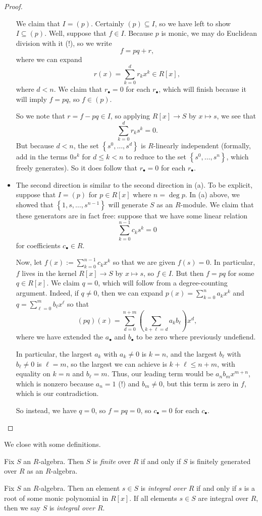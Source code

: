 \begin{proof}
\begin{itemize}
		We claim that $I=(p)$. Certainly $(p)\subseteq I$, so we have left to show $I\subseteq(p)$. Well, suppose that $f\in I$. Because $p$ is monic, we may do Euclidean division with it (!), so we write
		\[f=pq+r,\]
		where we can expand
		\[r(x)=\sum_{k=0}^dr_kx^k\in R[x],\]
		where $d<n$. We claim that $r_\bullet=0$ for each $r_\bullet$, which will finish because it will imply $f=pq$, so $f\in(p)$.

		So we note that $r=f-pq\in I$, so applying $R[x]\to S$ by $x\mapsto s$, we see that
		\[\sum_{k=0}^dr_ks^k=0.\]
		But because $d<n$, the set $\left\{s^0,\ldots,s^d\right\}$ is $R$-linearly independent (formally, add in the terms $0s^k$ for $d\le k<n$ to reduce to the set $\left\{s^0,\ldots,s^n\right\}$, which freely generates). So it does follow that $r_\bullet=0$ for each $r_\bullet$.

		\item The second direction is similar to the second direction in (a). To be explicit, suppose that $I=(p)$ for $p\in R[x]$ where $n=\deg p$. In (a) above, we showed that $\left\{1,s,\ldots,s^{n-1}\right\}$ will generate $S$ as an $R$-module. We claim that these generators are in fact free: suppose that we have some linear relation
		\[\sum_{k=0}^{n-1}c_ks^k=0\]
		for coefficients $c_\bullet\in R$.
		
		Now, let $f(x):=\sum_{k=0}^{n-1}c_kx^k$ so that we are given $f(s)=0$. In particular, $f$ lives in the kernel $R[x]\to S$ by $x\mapsto s$, so $f\in I$. But then $f=pq$ for some $q\in R[x]$. We claim $q=0$, which will follow from a degree-counting argument. Indeed, if $q\ne0$, then we can expand $p(x)=\sum_{k=0}^na_kx^k$ and $q=\sum_{\ell=0}^mb_\ell x^\ell$ so that
		\[(pq)(x)=\sum_{d=0}^{n+m}\left(\sum_{k+\ell=d}a_kb_\ell\right)x^d,\]
		where we have extended the $a_\bullet$ and $b_\bullet$ to be zero where previously undefiend.
		
		In particular, the largest $a_k$ with $a_k\ne0$ is $k=n$, and the largest $b_\ell$ with $b_\ell\ne0$ is $\ell=m$, so the largest we can achieve is $k+\ell\le n+m$, with equality on $k=n$ and $b_\ell=m$. Thus, our leading term would be $a_nb_mx^{m+n}$, which is nonzero because $a_n=1$ (!) and $b_m\ne0$, but this term is zero in $f$, which is our contradiction.

		So instead, we have $q=0$, so $f=pq=0$, so $c_\bullet=0$ for each $c_\bullet$.
		\qedhere
	\end{itemize}
\end{proof}
We close with some definitions.
\begin{definition}[Finite]
	Fix $S$ an $R$-algebra. Then $S$ is \textit{finite} over $R$ if and only if $S$ is finitely generated over $R$ as an $R$-algebra.
\end{definition}
\begin{definition}[Integral]
	Fix $S$ an $R$-algebra. Then an element $s\in S$ is \textit{integral over $R$} if and only if $s$ is a root of some monic polynomial in $R[x]$. If all elements $s\in S$ are integral over $R$, then we say $S$ is \textit{integral over $R$}.
\end{definition}
